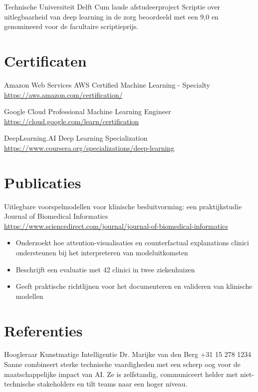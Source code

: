 \documentclass[a4paper, serif, 10pt]{moderncv}
\begin{document}
        {Technische Universiteit Delft}
        {Cum laude afstudeerproject}
        {}
        {}
        {Scriptie over uitlegbaarheid van deep learning in de zorg beoordeeld met een 9,0 en genomineerd voor de facultaire scriptieprijs.}
\section{Certificaten}

        {Amazon Web Services}
        {AWS Certified Machine Learning - Specialty}
        {\url{https://aws.amazon.com/certification/}}
        {}
        {}

        {Google Cloud}
        {Professional Machine Learning Engineer}
        {\url{https://cloud.google.com/learn/certification}}
        {}
        {}

        {DeepLearning.AI}
        {Deep Learning Specialization}
        {\url{https://www.coursera.org/specializations/deep-learning}}
        {}
        {}
\section{Publicaties}

        {Uitlegbare voorspelmodellen voor klinische besluitvorming: een praktijkstudie}
        {Journal of Biomedical Informatics}
        {\url{https://www.sciencedirect.com/journal/journal-of-biomedical-informatics}}
        {}
        {\begin{itemize}
\item Onderzoekt hoe attention-visualisaties en counterfactual explanations clinici ondersteunen bij het interpreteren van modeluitkomsten
\item Beschrijft een evaluatie met 42 clinici in twee ziekenhuizen
\item Geeft praktische richtlijnen voor het documenteren en valideren van klinische modellen
\end{itemize}}
\section{Referenties}

        {Hoogleraar Kunstmatige Intelligentie}
        {Dr. Marijke van den Berg}
        {+31 15 278 1234}
        {}
        {Sanne combineert sterke technische vaardigheden met een scherp oog voor de maatschappelijke impact van AI. Ze is zelfstandig, communiceert helder met niet-technische stakeholders en tilt teams naar een hoger niveau.}
\end{document}
